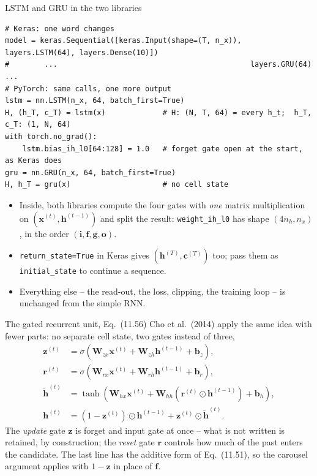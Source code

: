 \documentclass[10pt,aspectratio=169]{beamer}
\begin{document}
\begin{frame}[fragile]{LSTM and GRU in the two libraries}
\begin{lstlisting}
# Keras: one word changes
model = keras.Sequential([keras.Input(shape=(T, n_x)), layers.LSTM(64), layers.Dense(10)])
#        ...                                            layers.GRU(64)   ...
# PyTorch: same calls, one more output
lstm = nn.LSTM(n_x, 64, batch_first=True)
H, (h_T, c_T) = lstm(x)             # H: (N, T, 64) = every h_t;  h_T, c_T: (1, N, 64)
with torch.no_grad():
    lstm.bias_ih_l0[64:128] = 1.0   # forget gate open at the start, as Keras does
gru = nn.GRU(n_x, 64, batch_first=True)
H, h_T = gru(x)                     # no cell state
\end{lstlisting}
\small
\begin{itemize}
  \item Inside, both libraries compute the four gates with \emph{one}
        matrix multiplication on $(\bm{x}^{(t)},\bm{h}^{(t-1)})$ and split the
        result: \texttt{weight\_ih\_l0} has shape $(4n_h,n_x)$, in the order
        $(\bm{i},\bm{f},\bm{g},\bm{o})$.
  \item \texttt{return\_state=True} in Keras gives $(\bm{h}^{(T)},\bm{c}^{(T)})$
        too; pass them as \texttt{initial\_state} to continue a sequence.
  \item Everything else -- the read-out, the loss, clipping, the training
        loop -- is unchanged from the simple RNN.
\end{itemize}
\end{frame}

\begin{frame}{The gated recurrent unit, Eq.~(11.56)}
Cho et al.\ (2014) apply the same idea with fewer parts: no separate cell
state, two gates instead of three,
\[
\begin{aligned}
  \bm{z}^{(t)}&=\sigma\!\left(\bm{W}_{zx}\bm{x}^{(t)}+\bm{W}_{zh}\bm{h}^{(t-1)}+\bm{b}_z\right),\\
  \bm{r}^{(t)}&=\sigma\!\left(\bm{W}_{rx}\bm{x}^{(t)}+\bm{W}_{rh}\bm{h}^{(t-1)}+\bm{b}_r\right),\\
  \tilde{\bm{h}}^{(t)}&=\tanh\!\left(\bm{W}_{hx}\bm{x}^{(t)}+\bm{W}_{hh}\left(\bm{r}^{(t)}\odot\bm{h}^{(t-1)}\right)+\bm{b}_h\right),\\
  \bm{h}^{(t)}&=\left(1-\bm{z}^{(t)}\right)\odot\bm{h}^{(t-1)}+\bm{z}^{(t)}\odot\tilde{\bm{h}}^{(t)}.
\end{aligned}
\]
The \emph{update} gate $\bm{z}$ is forget and input gate at once -- what is
not written is retained, by construction; the \emph{reset} gate $\bm{r}$
controls how much of the past enters the candidate.  The last line has the
additive form of Eq.~(11.51), so the carousel argument applies with
$1-\bm{z}$ in place of $\bm{f}$.
\end{frame}
\end{document}
